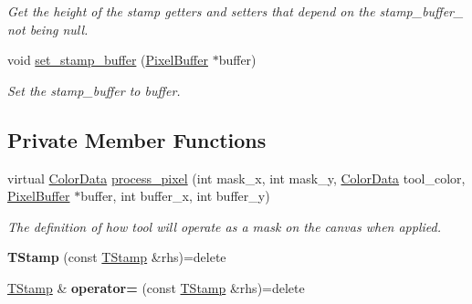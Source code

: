 \begin{DoxyCompactItemize}
\begin{DoxyCompactList}\small\item\em Get the height of the stamp getters and setters that depend on the stamp\+\_\+buffer\+\_\+ not being null. \end{DoxyCompactList}\item 
void \hyperlink{classimage__tools_1_1TStamp_a8c75d539609e224340895bf7e28a246b}{set\+\_\+stamp\+\_\+buffer} (\hyperlink{classimage__tools_1_1PixelBuffer}{Pixel\+Buffer} $\ast$buffer)\hypertarget{classimage__tools_1_1TStamp_a8c75d539609e224340895bf7e28a246b}{}\label{classimage__tools_1_1TStamp_a8c75d539609e224340895bf7e28a246b}

\begin{DoxyCompactList}\small\item\em Set the stamp\+\_\+buffer to buffer. \end{DoxyCompactList}\end{DoxyCompactItemize}
\subsection*{Private Member Functions}
\begin{DoxyCompactItemize}
\item 
virtual \hyperlink{classimage__tools_1_1ColorData}{Color\+Data} \hyperlink{classimage__tools_1_1TStamp_a656bb0af6d8f5ad6994caac1cf33d562}{process\+\_\+pixel} (int mask\+\_\+x, int mask\+\_\+y, \hyperlink{classimage__tools_1_1ColorData}{Color\+Data} tool\+\_\+color, \hyperlink{classimage__tools_1_1PixelBuffer}{Pixel\+Buffer} $\ast$buffer, int buffer\+\_\+x, int buffer\+\_\+y)
\begin{DoxyCompactList}\small\item\em The definition of how tool will operate as a mask on the canvas when applied. \end{DoxyCompactList}\item 
{\bfseries T\+Stamp} (const \hyperlink{classimage__tools_1_1TStamp}{T\+Stamp} \&rhs)=delete\hypertarget{classimage__tools_1_1TStamp_a86d6a6f4d87448aa40a15dfb739bc7ed}{}\label{classimage__tools_1_1TStamp_a86d6a6f4d87448aa40a15dfb739bc7ed}

\item 
\hyperlink{classimage__tools_1_1TStamp}{T\+Stamp} \& {\bfseries operator=} (const \hyperlink{classimage__tools_1_1TStamp}{T\+Stamp} \&rhs)=delete\hypertarget{classimage__tools_1_1TStamp_a30811bc3e0797e245cb668980bab288f}{}\label{classimage__tools_1_1TStamp_a30811bc3e0797e245cb668980bab288f}

\end{DoxyCompactItemize}
